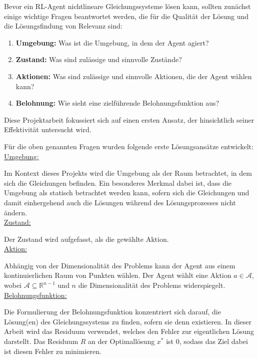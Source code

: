 \documentclass{article}
\theoremstyle{newline}
\begin{document}
\begin{onehalfspace}
Bevor ein RL-Agent nichtlineare Gleichungssysteme lösen kann, sollten zunächst einige wichtige Fragen beantwortet werden, die für die Qualität der Lösung und die Lösungsfindung von Relevanz sind:

\begin{enumerate}
	\item \textbf{Umgebung:} Was ist die Umgebung, in dem der Agent agiert?
	\item \textbf{Zustand:} Was sind zulässige und sinnvolle Zustände?
	\item \textbf{Aktionen:} Was sind zulässige und sinnvolle Aktionen, die der Agent wählen kann?
	\item \textbf{Belohnung:} Wie sieht eine zielführende Belohnungsfunktion aus?
\end{enumerate}

Diese Projektarbeit fokussiert sich auf einen ersten Ansatz, der hinsichtlich seiner Effektivität untersucht wird.

Für die oben genannten Fragen wurden folgende erste Lösungsansätze entwickelt:
\\

\underline{Umgebung:}
\smallskip

Im Kontext dieses Projekts wird die Umgebung als der Raum betrachtet, in dem sich die Gleichungen befinden. Ein besonderes Merkmal dabei ist, dass die Umgebung als statisch betrachtet werden kann, sofern sich die Gleichungen und damit einhergehend auch die Lösungen während des Lösungsprozesses nicht ändern.
\\

\underline{Zustand:}
\smallskip

Der Zustand wird aufgefasst, als die gewählte Aktion.
\\

\underline{Aktion:}
\smallskip

Abhängig von der Dimensionalität des Problems kann der Agent aus einem kontinuierlichen Raum von Punkten wählen. Der Agent wählt eine Aktion $a \in \mathcal{A}$, wobei $\mathcal{A} \subseteq \mathbb{R}^{n-1}$ und $n$ die Dimensionalität des Problems widerspiegelt.
\\
 
\underline{Belohnungsfunktion:}
\smallskip

Die Formulierung der Belohnungsfunktion konzentriert sich darauf, die Lösung(en) des Gleichungssystems zu finden, sofern sie denn existieren. In dieser Arbeit wird das Residuum verwendet, welches den Fehler zur eigentlichen Lösung darstellt. Das Residuum $R$ an der Optimallösung $x^{\ast}$ ist $0$, sodass das Ziel dabei ist diesen Fehler zu minimieren. 


\end{onehalfspace}
\end{document}
